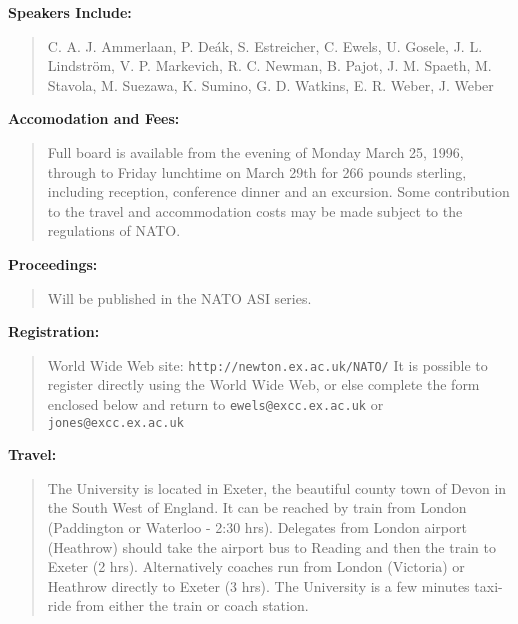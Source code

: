 {{\centering{
------------------------------------------------------------------------------}}

{\large{\bf Speakers Include:}}

\begin{quotation} \noindent
     C. A. J. Ammerlaan, P. De\'ak, S. Estreicher, C. Ewels,  U. Gosele,
     J. L. Lindstr\"om, V. P. Markevich, R. C. Newman, B. Pajot, J. M. Spaeth,
     M. Stavola, M. Suezawa, K. Sumino, G. D. Watkins, E. R. Weber, J. Weber
\end{quotation}

{\centering{
------------------------------------------------------------------------------}}

{\large{\bf Accomodation and Fees:}}

\begin{quotation} \noindent
     Full board is available from the evening of Monday March 25, 1996, through
     to Friday lunchtime on March 29th for 266 pounds sterling, including
     reception, conference dinner and an excursion. Some contribution to the
     travel and accommodation costs may be made subject to the regulations of
     NATO.
\end{quotation}

{\centering{
------------------------------------------------------------------------------}}

\newpage
{\large{\bf Proceedings:}}

\begin{quotation} \noindent
     Will be published in the NATO ASI series.
\end{quotation}

{\centering{
------------------------------------------------------------------------------}}

{\large{\bf Registration:}}

\begin{quotation} \noindent
     World Wide Web site: \verb+http://newton.ex.ac.uk/NATO/+
     It is possible to register directly using the World Wide Web, or else 
     complete the form enclosed below and return to \verb+ewels@excc.ex.ac.uk+
     or \verb+jones@excc.ex.ac.uk+
\end{quotation}

{\centering{
------------------------------------------------------------------------------}}

{\large{\bf Travel:}}

\begin{quotation} \noindent
     The University is located in Exeter, the beautiful county town of Devon in
     the South West of England. It can be reached by train from London
     (Paddington or Waterloo - 2:30 hrs). Delegates from London airport
     (Heathrow) should take the airport bus to Reading and then the train to
     Exeter (2 hrs). Alternatively coaches run from London (Victoria) or
     Heathrow directly to Exeter (3 hrs). The University is a few minutes
     taxi-ride from either the train or coach station.
\end{quotation}

}
